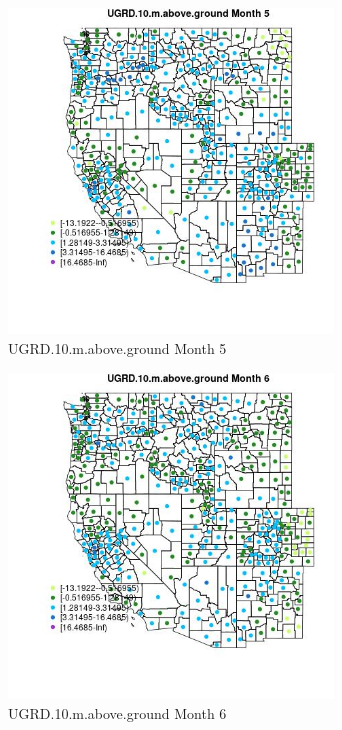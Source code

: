 \begin{figure} 
\centering  
\includegraphics[width=0.77\textwidth]{Code_Outputs/df_report_ML_predictors_CountyCentroid_Locations_Dates_2008-01-01to2018-12-31_MapObsMo5UGRD10maboveground.jpg} 
\caption{\label{fig:df_report_ML_predictors_CountyCentroid_Locations_Dates_2008-01-01to2018-12-31MapObsMo5UGRD10maboveground}UGRD.10.m.above.ground Month 5} 
\end{figure} 
 

\begin{figure} 
\centering  
\includegraphics[width=0.77\textwidth]{Code_Outputs/df_report_ML_predictors_CountyCentroid_Locations_Dates_2008-01-01to2018-12-31_MapObsMo6UGRD10maboveground.jpg} 
\caption{\label{fig:df_report_ML_predictors_CountyCentroid_Locations_Dates_2008-01-01to2018-12-31MapObsMo6UGRD10maboveground}UGRD.10.m.above.ground Month 6} 
\end{figure} 
 


